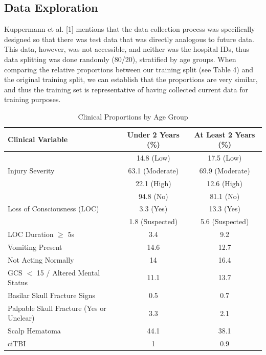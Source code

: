 \documentclass[10pt,letterpaper]{article}
\begin{document}
\subsection{Data Exploration}\label{data-exploration}

Kuppermann et al. [1] mentions that the data collection process was specifically designed so that there was test data that was directly analogous to future data. This data, however, was not accessible, and neither was the hospital IDs, thus data splitting was done randomly (80/20), stratified by age groups. When comparing the relative proportions between our training split (see Table 4) and the original training split, we can establish that the proportions are very similar, and thus the training set is representative of having collected current data for training purposes.

\begin{table}[htbp]
\centering
\caption{Clinical Proportions by Age Group}
\label{tab:clinical_proportions}
\begin{tabular}{lcc}
\toprule
\textbf{Clinical Variable} & \textbf{Under 2 Years (\%)} & \textbf{At Least 2 Years (\%)} \\
\midrule
\multirow{3}{*}{Injury Severity} & 14.8 (Low) & 17.5 (Low) \\
~ & 63.1 (Moderate) & 69.9 (Moderate) \\ 
~ & 22.1 (High) & 12.6 (High) \\ \hline
\multirow{3}{*}{Loss of Consciousness (LOC)} & 94.8 (No) & 81.1 (No) \\
~ & 3.3 (Yes) & 13.3 (Yes) \\ 
~ & 1.8 (Suspected) & 5.6 (Suspected) \\ \hline
LOC Duration $\ge$ 5s & 3.4 & 9.2 \\ \hline
Vomiting Present & 14.6 & 12.7 \\ \hline
Not Acting Normally & 14 & 16.4 \\ \hline
GCS $<$ 15 / Altered Mental Status & 11.1 & 13.7 \\ \hline
Basilar Skull Fracture Signs & 0.5 & 0.7 \\ \hline
Palpable Skull Fracture (Yes or Unclear)& 3.3 & 2.1 \\ \hline
Scalp Hematoma & 44.1 & 38.1 \\ \hline
ciTBI & 1 & 0.9 \\ \hline
\bottomrule
\end{tabular}
\end{table}
\end{document}
